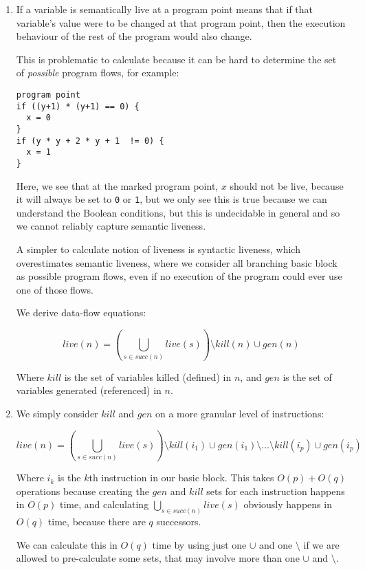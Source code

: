 


\begin{enumerate}[label=(\alph*)]
  \item
    If a variable is semantically live at a program point means that if that variable's value were to be changed at that program point, then the execution behaviour of the rest of the program would also change.

    This is problematic to calculate because it can be hard to determine the set of \textit{possible} program flows, for example:

\begin{verbatim}
program point
if ((y+1) * (y+1) == 0) {
  x = 0
}
if (y * y + 2 * y + 1  != 0) {
  x = 1
}
\end{verbatim}

Here, we see that at the marked program point, $x$ should not be live, because it will always be set to \texttt{0} or \texttt{1}, but we only see this is true because we can understand the Boolean conditions, but this is undecidable in general and so we cannot reliably capture semantic liveness.

A simpler to calculate notion of liveness is syntactic liveness, which overestimates semantic liveness, where we consider all branching basic block as possible program flows, even if no execution of the program could ever use one of those flows.

We derive data-flow equations:

\[
  live(n) = \left(\bigcup_{s \in succ(n)} live(s)\right) \setminus kill(n) \cup gen(n)
\] 

Where $kill$ is the set of variables killed (defined) in $n$, and $gen$ is the set of variables generated (referenced) in $n$.
\item

  We simply consider $kill$ and $gen$ on a more granular level of instructions:

  \[
    live(n) = \left(\bigcup_{s \in succ(n)} live(s)\right) \setminus kill(i_1) \cup gen(i_1) \setminus \ldots \setminus kill(i_p) \cup gen(i_p)
  \] 

  Where $i_k$ is the $k$th instruction in our basic block. This takes $O(p) + O(q)$ operations because creating the $gen$ and $kill$ sets for each instruction happens in $O(p)$ time, and calculating $\bigcup_{s \in succ(n)} live(s)$ obviously happens in $O(q)$ time, because there are $q$ successors.

  We can calculate this in $O(q)$ time by using just one $\cup$ and one $\setminus$ if we are allowed to pre-calculate some sets, that may involve more than one $\cup$ and $\setminus$.


\end{enumerate}
